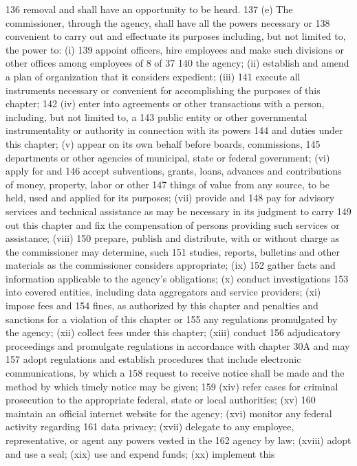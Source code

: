 136 removal and shall have an opportunity to be heard.
137 (e) The commissioner, through the agency, shall have all the powers necessary or
138 convenient to carry out and effectuate its purposes including, but not limited to, the power to: (i)
139 appoint officers, hire employees and make such divisions or other offices among employees of
8 of 37
140 the agency; (ii) establish and amend a plan of organization that it considers expedient; (iii)
141 execute all instruments necessary or convenient for accomplishing the purposes of this chapter;
142 (iv) enter into agreements or other transactions with a person, including, but not limited to, a
143 public entity or other governmental instrumentality or authority in connection with its powers
144 and duties under this chapter; (v) appear on its own behalf before boards, commissions,
145 departments or other agencies of municipal, state or federal government; (vi) apply for and
146 accept subventions, grants, loans, advances and contributions of money, property, labor or other
147 things of value from any source, to be held, used and applied for its purposes; (vii) provide and
148 pay for advisory services and technical assistance as may be necessary in its judgment to carry
149 out this chapter and fix the compensation of persons providing such services or assistance; (viii)
150 prepare, publish and distribute, with or without charge as the commissioner may determine, such
151 studies, reports, bulletins and other materials as the commissioner considers appropriate; (ix)
152 gather facts and information applicable to the agency’s obligations; (x) conduct investigations
153 into covered entities, including data aggregators and service providers; (xi) impose fees and
154 fines, as authorized by this chapter and penalties and sanctions for a violation of this chapter or
155 any regulations promulgated by the agency; (xii) collect fees under this chapter; (xiii) conduct
156 adjudicatory proceedings and promulgate regulations in accordance with chapter 30A and may
157 adopt regulations and establish procedures that include electronic communications, by which a
158 request to receive notice shall be made and the method by which timely notice may be given;
159 (xiv) refer cases for criminal prosecution to the appropriate federal, state or local authorities; (xv)
160 maintain an official internet website for the agency; (xvi) monitor any federal activity regarding
161 data privacy; (xvii) delegate to any employee, representative, or agent any powers vested in the
162 agency by law; (xviii) adopt and use a seal; (xix) use and expend funds; (xx) implement this
